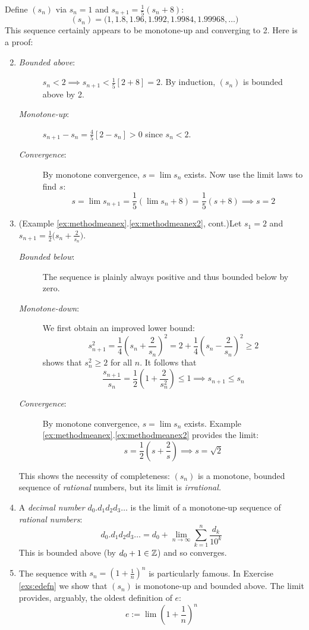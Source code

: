 \begin{examples}{}{}
	\exstart Define $(s_n)$ via $s_n=1$ and $s_{n+1}=\frac 15(s_n+8)$:
	\[
		(s_n)=\bigl(1,1.8,1.96,1.992,1.9984,1.99968,\ldots\bigr)
	\]
	This sequence certainly appears to be monotone-up and converging to 2. Here is a proof: 
	\begin{enumerate}\setcounter{enumi}{1}
	  \item[]\begin{description}
    	\item[\normalfont\emph{Bounded above}:] $s_n<2\implies s_{n+1}<\frac 15\left[2+8\right]=2$. By induction, $(s_n)$ is bounded above by 2.
    	\item[\normalfont\emph{Monotone-up}:] $s_{n+1}-s_n=\frac 45\left[2-s_n\right]>0$ since $s_n<2$.  
    	\item[\normalfont\emph{Convergence}:] By monotone convergence, $s=\lim s_n$ exists. Now use the limit laws to find $s$:
  		\[
  			s=\lim s_{n+1}=\frac 15\left(\lim s_n+8\right)=\frac 15(s+8)\implies s=2
  		\] 
  	\end{description}
  
  	\item (Example \ref*{ex:methodmeanex}.\ref{ex:methodmeanex2}, cont.)\lstsp Let $s_1=2$ and $s_{n+1}=\frac 12\bigl(s_n+\frac 2{s_n}\bigr)$.
  	\begin{description}
	    \item[\normalfont\emph{Bounded below}:] The sequence is plainly always positive and thus bounded below by zero.
	    \item[\normalfont\emph{Monotone-down}:] We first obtain an improved lower bound:
	    \[
	    	s_{n+1}^2=\frac 14\left(s_n+\frac 2{s_n}\right)^2=2+\frac 14\left(s_n-\frac 2{s_n}\right)^2\ge 2
	    \]
	    shows\footnotemark{} that $s_n^2\ge 2$ for all $n$. It follows that
	    \[
	    	\frac{s_{n+1}}{s_n}=\frac 12\left(1+\frac 2{s_n^2}\right)\le 1\implies s_{n+1}\le s_n
	    \]
	    \item[\normalfont\emph{Convergence}:] By monotone convergence, $s=\lim s_n$ exists. Example \ref*{ex:methodmeanex}.\ref{ex:methodmeanex2} provides the limit:
	  	\[
	  		s=\frac 12\left(s+\frac 2s\right)\implies s=\sqrt 2
	  	\] 
  	\end{description}
  	This shows the necessity of completeness: $(s_n)$ is a monotone, bounded sequence of \emph{rational} numbers, but its limit is \emph{irrational.}
  	
  	\item A \emph{decimal number} $d_0.d_1d_2d_3\ldots$ is the limit of a monotone-up sequence of \emph{rational numbers}:
  	\[
  		d_0.d_1d_2d_3\ldots =d_0+\lim_{n\to\infty}\sum_{k=1}^n \frac{d_k}{10^k}
  	\]
  	This is bounded above (by $d_0+1\in\mathbb{Z}$) and so converges.
  
    \item The sequence with $s_n=\left(1+\frac 1n\right)^n$ is particularly famous. In Exercise \ref{exs:edefn} we show that $(s_n)$ is monotone-up and bounded above. The limit provides, arguably, the oldest definition of $e$:
  	\[
  		e:=\lim\left(1+\frac 1n\right)^n
  	\]
	\end{enumerate}
\end{examples}

